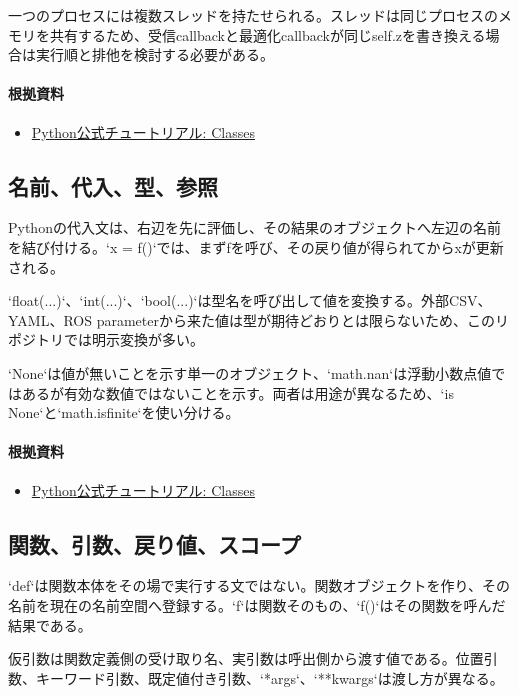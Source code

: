 \documentclass[a4paper,11pt]{article}
\begin{document}
一つのプロセスには複数スレッドを持たせられる。スレッドは同じプロセスのメモリを共有するため、受信callbackと最適化callbackが同じself.zを書き換える場合は実行順と排他を検討する必要がある。

\paragraph{根拠資料}
\begin{itemize}[leftmargin=1.6em]
\item \href{https://docs.python.org/3/tutorial/classes.html}{Python公式チュートリアル: Classes}
\end{itemize}

\subsection{名前、代入、型、参照}
Pythonの代入文は、右辺を先に評価し、その結果のオブジェクトへ左辺の名前を結び付ける。`x = f()`では、まずfを呼び、その戻り値が得られてからxが更新される。


`float(...)`、`int(...)`、`bool(...)`は型名を呼び出して値を変換する。外部CSV、YAML、ROS parameterから来た値は型が期待どおりとは限らないため、このリポジトリでは明示変換が多い。


`None`は値が無いことを示す単一のオブジェクト、`math.nan`は浮動小数点値ではあるが有効な数値ではないことを示す。両者は用途が異なるため、`is None`と`math.isfinite`を使い分ける。

\paragraph{根拠資料}
\begin{itemize}[leftmargin=1.6em]
\item \href{https://docs.python.org/3/tutorial/classes.html}{Python公式チュートリアル: Classes}
\end{itemize}

\subsection{関数、引数、戻り値、スコープ}
`def`は関数本体をその場で実行する文ではない。関数オブジェクトを作り、その名前を現在の名前空間へ登録する。`f`は関数そのもの、`f()`はその関数を呼んだ結果である。


仮引数は関数定義側の受け取り名、実引数は呼出側から渡す値である。位置引数、キーワード引数、既定値付き引数、`*args`、`**kwargs`は渡し方が異なる。
\end{document}
